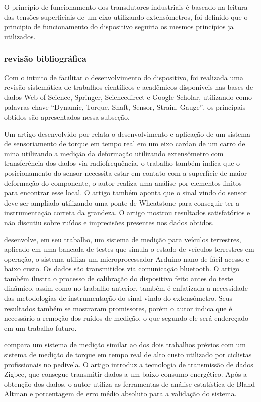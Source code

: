 O princípio de funcionamento dos transdutores industriais é baseado na leitura das tensões superficiais de um eixo utilizando extensômetros, foi definido que o principio de funcionamento do dispositivo seguiria os mesmos princípios ja utilizados.

\subsubsection[]{revisão bibliográfica}

Com o intuito de facilitar o desenvolvimento do dispositivo, foi realizada uma revisão sistemática de trabalhos científicos e acadêmicos disponíveis nas bases de dados Web of Science, Springer, Sciencedirect e Google Scholar, utilizando como palavras-chave “Dynamic, Torque, Shaft, Sensor, Strain, Gauge”, os principais obtidos são apresentados nessa subseção.

Um artigo desenvolvido por \autocite{Niedworok2014} relata o desenvolvimento e aplicação de um sistema de sensoriamento de torque em tempo real em um eixo cardan de um carro de mina utilizando a medição da deformação utilizando extensômetro com transferência dos dados via radiofrequência, o trabalho também indica que o posicionamento do sensor necessita estar em contato com a superfície de maior deformação do componente, o autor realiza uma análise por elementos finitos para encontrar esse local. O artigo também aponta que o sinal vindo do sensor deve ser ampliado utilizando uma ponte de Wheatstone para conseguir ter a instrumentação correta da grandeza. O artigo mostrou resultados satisfatórios e não discutiu sobre ruídos e imprecisões presentes nos dados obtidos.

\autocite{Nurprasetio2018} desenvolve, em seu trabalho, um sistema de medição para veículos terrestres, aplicado em uma bancada de testes que simula o estado de veículos terrestres em operação, o sistema utiliza um microprocessador Arduino nano de fácil acesso e baixo custo. Os dados são transmitidos via comunicação bluetooth. O artigo também ilustra o processo de calibração do dispositivo feito antes do teste dinâmico, assim como no trabalho anterior, também é enfatizada a necessidade das metodologias de instrumentação do sinal vindo do extensômetro. Seus resultados também se mostraram promissores, porém o autor indica que é necessário a remoção dos ruídos de medição, o que segundo ele será endereçado em um trabalho futuro.

\autocite{Gharghan2017} compara um sistema de medição similar ao dos dois trabalhos prévios com um sistema de medição de torque em tempo real de alto custo utilizado por ciclistas profissionais no pedivela. O artigo introduz a tecnologia de transmissão de dados Zigbee, que consegue transmitir dados a um baixo consumo energético. Após a obtenção dos dados, o autor utiliza as ferramentas de análise estatística de Bland-Altman e porcentagem de erro médio absoluto para a validação do sistema.

